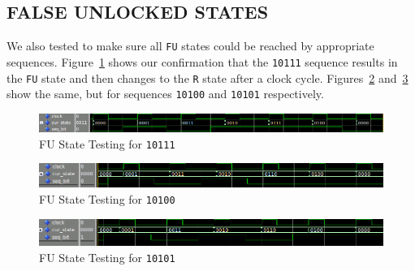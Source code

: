 \documentclass[paper=a4, fontsize=11pt,twoside]{scrartcl}
\begin{document}
	\subsection{FALSE UNLOCKED STATES} %
	\label{sub:false_unlocked_states}
	We also tested to make sure all \texttt{FU} states could be reached by appropriate sequences. Figure~\ref{fig:FU1} shows our confirmation that the \texttt{10111} sequence results in the \texttt{FU} state and then changes to the \texttt{R} state after a clock cycle. Figures~\ref{fig:FU2} and~\ref{fig:FU3} show the same, but for sequences \texttt{10100} and \texttt{10101} respectively.

	\begin{figure}[ht]
		\centering
		\includegraphics[scale=1.2]{1stFU.png}
		\caption{FU State Testing for \texttt{10111}}
		\label{fig:FU1}
	\end{figure}
	\begin{figure}[ht]
		\centering
		\includegraphics[scale=1.2]{2ndFU.png}
		\caption{FU State Testing for \texttt{10100}}
		\label{fig:FU2}
	\end{figure}
	\begin{figure}[ht]
		\centering
		\includegraphics[scale=1.2]{3rdFU.png}
		\caption{FU State Testing for \texttt{10101}}
		\label{fig:FU3}
	\end{figure}
\end{document}
